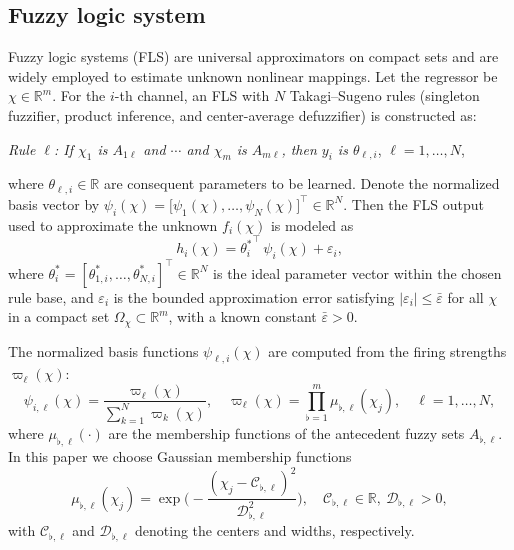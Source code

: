 \documentclass[pdflatex,sn-mathphys-num]{sn-jnl}%
\theoremstyle{thmstyleone}%
\newtheorem{assumption}{Assumption}
\theoremstyle{thmstyletwo}%
\theoremstyle{thmstylethree}%
\begin{document}




\subsection{Fuzzy logic system }
\par Fuzzy logic systems (FLS) are universal approximators on compact sets and are widely employed to estimate unknown nonlinear mappings. Let the regressor be $\chi\in\mathbb{R}^m$. For the $i$-th channel, an FLS with $N$ Takagi--Sugeno rules (singleton fuzzifier, product inference, and center-average defuzzifier) is constructed as:
\begin{center}
\emph{Rule $\ell$: If $\chi_1$ is $A_{1\ell}$ and $\cdots$ and $\chi_m$ is $A_{m\ell}$, then $y_i$ is $\theta_{\ell,i}$}, \quad $\ell=1,\dots,N$,
\end{center}
where $\theta_{\ell,i}\in\mathbb{R}$ are consequent parameters to be learned. Denote the normalized basis vector by
\(
\psi_i(\chi)=\big[\psi_{1}(\chi),\dots,\psi_{N}(\chi)\big]^\top\in\mathbb{R}^N.
\)
Then the FLS output used to approximate the unknown $f_i(\chi)$ is modeled as
\begin{equation}
    h_i(\chi) = {\theta_i^*}^{\!\top}\,\psi_i(\chi)+\varepsilon_i,
    \label{eq:4}
\end{equation}
where $\theta_i^*=[\theta_{1,i}^*,\dots,\theta_{N,i}^*]^\top\in\mathbb{R}^N$ is the ideal parameter vector within the chosen rule base, and $\varepsilon_i$ is the bounded approximation error satisfying $|\varepsilon_i|\le\bar\varepsilon$ for all $\chi$ in a compact set $\Omega_\chi\subset\mathbb{R}^m$, with a known constant $\bar\varepsilon>0$.

\par The normalized basis functions $\psi_{\ell,i}(\chi)$ are computed from the firing strengths $\varpi_\ell(\chi)$:
\begin{equation}
    \psi_{i,\ell}(\chi)=\frac{\varpi_\ell(\chi)}{\sum_{k=1}^N \varpi_k(\chi)},
    \quad
    \varpi_\ell(\chi)=\prod_{\flat=1}^m \mu_{\flat,\ell}(\chi_j),
    \quad \ell=1,\dots,N,
    \label{eq:5}
\end{equation} 
where $\mu_{\flat,\ell}(\cdot)$ are the membership functions of the antecedent fuzzy sets $A_{\flat,\ell}$. In this paper we choose Gaussian membership functions
\[
\mu_{\flat,\ell}(\chi_j)=\exp\!\Big(-\frac{(\chi_j-\mathcal{C}_{\flat,\ell})^2}{\mathcal{D}_{\flat,\ell}^2}\Big),\quad
\mathcal{C}_{\flat,\ell}\in\mathbb{R},\ \mathcal{D}_{\flat,\ell}>0,
\]
with $\mathcal{C}_{\flat,\ell}$ and $\mathcal{D}_{\flat ,\ell}$ denoting the centers and widths, respectively.
\end{document}
